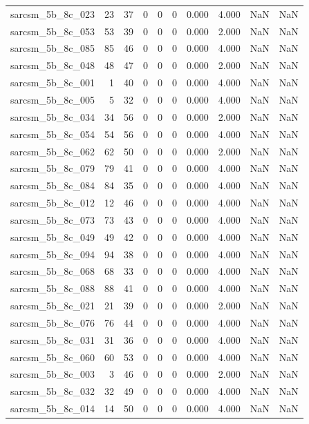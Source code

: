 \documentclass{article}
\begin{document}
\begin{longtable}{lrrrrrrrrr}
sarcsm\_5b\_8c\_023 & 23 & 37 & 0 & 0 & 0 & 0.000 & 4.000 & NaN & NaN \\
sarcsm\_5b\_8c\_053 & 53 & 39 & 0 & 0 & 0 & 0.000 & 2.000 & NaN & NaN \\
sarcsm\_5b\_8c\_085 & 85 & 46 & 0 & 0 & 0 & 0.000 & 4.000 & NaN & NaN \\
sarcsm\_5b\_8c\_048 & 48 & 47 & 0 & 0 & 0 & 0.000 & 2.000 & NaN & NaN \\
sarcsm\_5b\_8c\_001 & 1 & 40 & 0 & 0 & 0 & 0.000 & 4.000 & NaN & NaN \\
sarcsm\_5b\_8c\_005 & 5 & 32 & 0 & 0 & 0 & 0.000 & 4.000 & NaN & NaN \\
sarcsm\_5b\_8c\_034 & 34 & 56 & 0 & 0 & 0 & 0.000 & 2.000 & NaN & NaN \\
sarcsm\_5b\_8c\_054 & 54 & 56 & 0 & 0 & 0 & 0.000 & 4.000 & NaN & NaN \\
sarcsm\_5b\_8c\_062 & 62 & 50 & 0 & 0 & 0 & 0.000 & 2.000 & NaN & NaN \\
sarcsm\_5b\_8c\_079 & 79 & 41 & 0 & 0 & 0 & 0.000 & 4.000 & NaN & NaN \\
sarcsm\_5b\_8c\_084 & 84 & 35 & 0 & 0 & 0 & 0.000 & 4.000 & NaN & NaN \\
sarcsm\_5b\_8c\_012 & 12 & 46 & 0 & 0 & 0 & 0.000 & 4.000 & NaN & NaN \\
sarcsm\_5b\_8c\_073 & 73 & 43 & 0 & 0 & 0 & 0.000 & 4.000 & NaN & NaN \\
sarcsm\_5b\_8c\_049 & 49 & 42 & 0 & 0 & 0 & 0.000 & 4.000 & NaN & NaN \\
sarcsm\_5b\_8c\_094 & 94 & 38 & 0 & 0 & 0 & 0.000 & 4.000 & NaN & NaN \\
sarcsm\_5b\_8c\_068 & 68 & 33 & 0 & 0 & 0 & 0.000 & 4.000 & NaN & NaN \\
sarcsm\_5b\_8c\_088 & 88 & 41 & 0 & 0 & 0 & 0.000 & 4.000 & NaN & NaN \\
sarcsm\_5b\_8c\_021 & 21 & 39 & 0 & 0 & 0 & 0.000 & 2.000 & NaN & NaN \\
sarcsm\_5b\_8c\_076 & 76 & 44 & 0 & 0 & 0 & 0.000 & 4.000 & NaN & NaN \\
sarcsm\_5b\_8c\_031 & 31 & 36 & 0 & 0 & 0 & 0.000 & 4.000 & NaN & NaN \\
sarcsm\_5b\_8c\_060 & 60 & 53 & 0 & 0 & 0 & 0.000 & 4.000 & NaN & NaN \\
sarcsm\_5b\_8c\_003 & 3 & 46 & 0 & 0 & 0 & 0.000 & 2.000 & NaN & NaN \\
sarcsm\_5b\_8c\_032 & 32 & 49 & 0 & 0 & 0 & 0.000 & 4.000 & NaN & NaN \\
sarcsm\_5b\_8c\_014 & 14 & 50 & 0 & 0 & 0 & 0.000 & 4.000 & NaN & NaN \\

\end{longtable}
\end{document}
